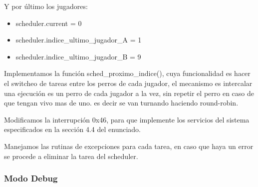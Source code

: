 Y por \'ultimo los jugadores: \\

\begin{itemize}
	\item scheduler.current = 0
	\item scheduler.indice_ultimo_jugador_A = 1
	\item scheduler.indice_ultimo_jugador_B = 9
\end{itemize}


\indent Implementamos la funci\'on sched\_proximo\_indice(), cuya funcionalidad es hacer el switcheo de tareas entre los perros de cada jugador, el mecanismo es intercalar una ejecuci\'on es un perro de cada jugador a la vez, sin repetir el perro en caso de que tengan vivo mas de uno. es decir se  van turnando haciendo round-robin.

\indent Modificamos la interrupci\'on 0x46, para que implemente los servicios del sistema especificados en la secci\'on 4.4 del enunciado.


\indent  Manejamos las rutinas de excepciones para cada tarea, en caso que haya un error se procede a eliminar la tarea del scheduler.

\subsubsection{Modo Debug}



\newpage



